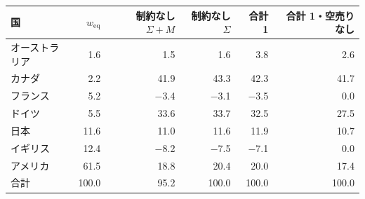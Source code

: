 \begin{tabular}{lrrrrr}
\toprule
国 & $w_{\mathrm{eq}}$ & 制約なし $\Sigma{+}M$ & 制約なし $\Sigma$ & 合計 1 & 合計 1・空売りなし \\
\midrule
オーストラリア & 1.6 & 1.5 & 1.6 & 3.8 & 2.6 \\
カナダ & 2.2 & 41.9 & 43.3 & 42.3 & 41.7 \\
フランス & 5.2 & \ensuremath{-}3.4 & \ensuremath{-}3.1 & \ensuremath{-}3.5 & 0.0 \\
ドイツ & 5.5 & 33.6 & 33.7 & 32.5 & 27.5 \\
日本 & 11.6 & 11.0 & 11.6 & 11.9 & 10.7 \\
イギリス & 12.4 & \ensuremath{-}8.2 & \ensuremath{-}7.5 & \ensuremath{-}7.1 & 0.0 \\
アメリカ & 61.5 & 18.8 & 20.4 & 20.0 & 17.4 \\
\midrule
合計 & 100.0 & 95.2 & 100.0 & 100.0 & 100.0 \\
\bottomrule
\end{tabular}
